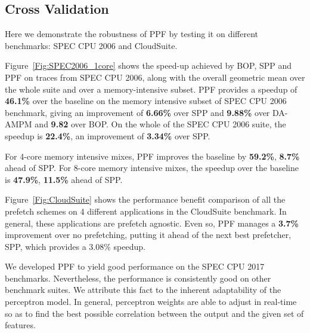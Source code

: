 \subsection{Cross Validation}
\label{Results-CrossVal}


Here we demonstrate the robustness of PPF by testing it on different
benchmarks: SPEC CPU 2006 and CloudSuite.


Figure~\ref{Fig:SPEC2006_1core} shows the speed-up achieved by BOP, SPP and
PPF on traces from SPEC CPU 2006, along with the overall geometric mean over
the whole suite and over a memory-intensive subset. PPF provides a speedup of
\textbf{46.1\%} over the baseline on the memory intensive subset of SPEC CPU
2006 benchmark, giving an improvement of \textbf{6.66\%} over SPP and
\textbf{9.88\%} over DA-AMPM and \textbf{9.82} over BOP. On the whole of 
the SPEC CPU 2006 suite, the speedup is \textbf{22.4\%}, an improvement 
of \textbf{3.34\%} over SPP.

For 4-core memory intensive mixes, PPF improves the baseline by
\textbf{59.2\%}, \textbf{8.7\%} ahead of SPP. For 8-core memory intensive
mixes, the speedup over the baseline is \textbf{47.9\%}, \textbf{11.5\%} ahead
of SPP.

Figure~\ref{Fig:CloudSuite} shows the performance benefit comparison of all
the prefetch schemes on 4 different applications in the CloudSuite benchmark.
In general, these applications are prefetch agnostic. Even so, PPF manages a
\textbf{3.7\%} improvement over no prefetching, putting it ahead of the next
best prefetcher, SPP, which provides a 3.08\% speedup.

We developed PPF to yield good performance on the SPEC CPU 2017 benchmarks.
Nevertheless, the performance is consistently good on other benchmark suites.
We attribute this fact to the inherent adaptability of the perceptron model.
In general, perceptron weights are able to adjust in real-time so as to find
the best possible correlation between the output and the given set of
features.
